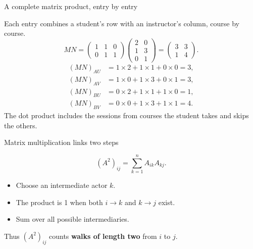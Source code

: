 \documentclass[aspectratio=169,11pt]{beamer}
\begin{document}
\begin{frame}{A complete matrix product, entry by entry}

Each entry combines a student's row with an instructor's column, course by course.
\[
MN=\begin{pmatrix}1&1&0\\0&1&1\end{pmatrix}
\begin{pmatrix}2&0\\1&3\\0&1\end{pmatrix}
=\begin{pmatrix}3&3\\1&4\end{pmatrix}.
\]
\begin{align*}
(MN)_{AU}&=1\times2+1\times1+0\times0=3,\\
(MN)_{AV}&=1\times0+1\times3+0\times1=3,\\
(MN)_{BU}&=0\times2+1\times1+1\times0=1,\\
(MN)_{BV}&=0\times0+1\times3+1\times1=4.
\end{align*}
\textcolor{accent}{The dot product includes the sessions from courses the student takes and skips the others.}

\end{frame}

\begin{frame}{Matrix multiplication links two steps}

\[(A^2)_{ij}=\sum_{k=1}^n A_{ik}A_{kj}.\]
\begin{itemize}
\item Choose an intermediate actor $k$.
\medskip\item The product is 1 when both $i\to k$ and $k\to j$ exist.
\medskip\item Sum over all possible intermediaries.
\end{itemize}
Thus $(A^2)_{ij}$ counts \textbf{walks of length two} from $i$ to $j$.


\end{frame}
\end{document}
